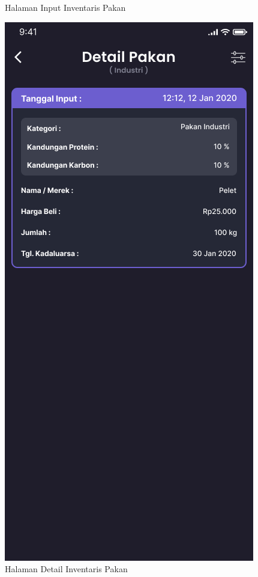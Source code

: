 \begin{spacing}{1.5}
\begin{figure}[H]
			\caption{Halaman Input Inventaris Pakan}
		\endminipage\hfill
			\includegraphics[width=\linewidth]{gambar/sprint1/mockup_list_feed.png}
			\caption{Halaman Detail Inventaris Pakan}
		\endminipage
	\end{figure}


\end{spacing}

